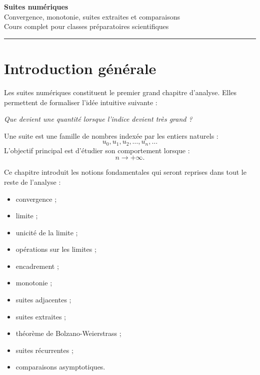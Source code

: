 \documentclass[11pt,a4paper]{article}
\begin{document}
\begin{center}
    {\Huge \textbf{Suites numériques}}\\[2mm]
    {\Large Convergence, monotonie, suites extraites et comparaisons}\\[2mm]
    {\large Cours complet pour classes préparatoires scientifiques}\\[2mm]
    \rule{0.88\linewidth}{0.5pt}
\end{center}

\vspace{0.4cm}

\tableofcontents

\newpage

\section*{Introduction générale}

Les suites numériques constituent le premier grand chapitre d'analyse. Elles permettent de formaliser l'idée intuitive suivante :

\begin{center}
\textit{Que devient une quantité lorsque l'indice devient très grand ?}
\end{center}

Une suite est une famille de nombres indexée par les entiers naturels :
\[
u_0,u_1,u_2,\dots,u_n,\dots
\]
L'objectif principal est d'étudier son comportement lorsque :
\[
n\to+\infty.
\]

Ce chapitre introduit les notions fondamentales qui seront reprises dans tout le reste de l'analyse :
\begin{itemize}
    \item convergence ;
    \item limite ;
    \item unicité de la limite ;
    \item opérations sur les limites ;
    \item encadrement ;
    \item monotonie ;
    \item suites adjacentes ;
    \item suites extraites ;
    \item théorème de Bolzano-Weierstrass ;
    \item suites récurrentes ;
    \item comparaisons asymptotiques.
\end{itemize}
\end{document}
